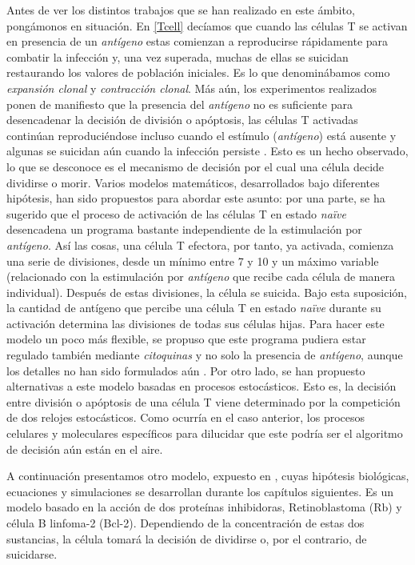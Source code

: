 Antes de ver los distintos trabajos que se han realizado en este ámbito, pongámonos en situación. En \ref{Tcell} decíamos que cuando las células T se activan en presencia de un \textit{antígeno} estas comienzan a reproducirse rápidamente para combatir la infección y, una vez superada, muchas de ellas se suicidan restaurando los valores de población iniciales. Es lo que denominábamos como \textit{expansión clonal} y \textit{contracción clonal}. Más aún, los experimentos realizados ponen de manifiesto que la presencia del \textit{antígeno} no es suficiente para desencadenar la decisión de división o apóptosis, las células T activadas continúan reproduciéndose incluso cuando el estímulo (\textit{antígeno}) está ausente y algunas se suicidan aún cuando la infección persiste \citep{JTB}. Esto es un hecho observado, lo que se desconoce es el mecanismo de decisión por el cual una célula decide dividirse o morir. Varios modelos matemáticos, desarrollados bajo diferentes hipótesis, han sido propuestos para abordar este asunto: por una parte, se ha sugerido que el proceso de activación de las células T en estado \textit{naïve} desencadena un programa bastante independiente de la estimulación por \textit{antígeno}. Así las cosas, una célula T efectora, por tanto, ya activada, comienza una serie de divisiones, desde un mínimo entre 7 y 10 y un máximo variable (relacionado con la estimulación por \textit{antígeno} que recibe cada célula de manera individual). Después de estas divisiones, la célula se suicida. Bajo esta suposición, la cantidad de antígeno que percibe una célula T en estado \textit{naïve} durante su activación determina las divisiones de todas sus células hijas. Para hacer este modelo un poco más flexible, se propuso que este programa pudiera estar regulado también mediante \textit{citoquinas} y no solo la presencia de \textit{antígeno}, aunque los detalles no han sido formulados aún \citep{JTB}. Por otro lado, se han propuesto alternativas a este modelo basadas en procesos estocásticos. Esto es, la decisión entre división o apóptosis de una célula T viene determinado por la competición de dos relojes estocásticos. Como ocurría en el caso anterior, los procesos celulares y moleculares específicos para dilucidar que este podría ser el algoritmo de decisión aún están en el aire. 

A continuación presentamos otro modelo, expuesto en \cite{JTB}, cuyas hipótesis biológicas, ecuaciones y simulaciones se desarrollan durante los capítulos siguientes. Es un modelo basado en la acción de dos proteínas inhibidoras, Retinoblastoma (Rb) y célula B linfoma-2 (Bcl-2). Dependiendo de la concentración de estas dos sustancias, la célula tomará la decisión de dividirse o, por el contrario, de suicidarse.  


